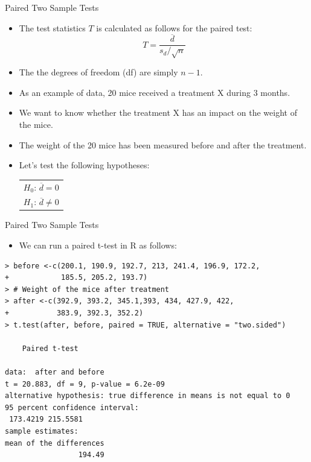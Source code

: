 \documentclass[handout]{beamer}
\begin{document}
\begin{frame}{Paired Two Sample Tests}
 \scriptsize{

\begin{itemize}
 
 \item The test statistics $T$ is calculated as follows for the paired test:
 \begin{displaymath}
  T = \frac{\overline{d}}{s_d/\sqrt{n}}
 \end{displaymath}

 \item The the degrees of freedom (df) are simply $n-1$.

\item As an example of data, 20 mice received a treatment X during 3 months.

\item We want to know whether the treatment X has an impact on the weight of the mice.

\item The weight of the 20 mice has been measured before and after the treatment. 

\item Let's test the following hypotheses:
 
  \begin{table}
\center
 \begin{tabular}{c}  
$H_0$: $\overline{d}=0$  \\
$H_1$: $\overline{d}\neq0$
\end{tabular} 
\end{table}
 
\end{itemize}



}
\end{frame}

\begin{frame}[fragile]{Paired Two Sample Tests}
 \scriptsize{

\begin{itemize}
 
 \item We can run a paired t-test in R as follows:
 
 
\end{itemize}

\begin{verbatim}
> before <-c(200.1, 190.9, 192.7, 213, 241.4, 196.9, 172.2,
+            185.5, 205.2, 193.7)
> # Weight of the mice after treatment
> after <-c(392.9, 393.2, 345.1,393, 434, 427.9, 422, 
+           383.9, 392.3, 352.2)
> t.test(after, before, paired = TRUE, alternative = "two.sided")

	Paired t-test

data:  after and before
t = 20.883, df = 9, p-value = 6.2e-09
alternative hypothesis: true difference in means is not equal to 0
95 percent confidence interval:
 173.4219 215.5581
sample estimates:
mean of the differences 
                 194.49 
\end{verbatim}


}
\end{frame}
\end{document}
